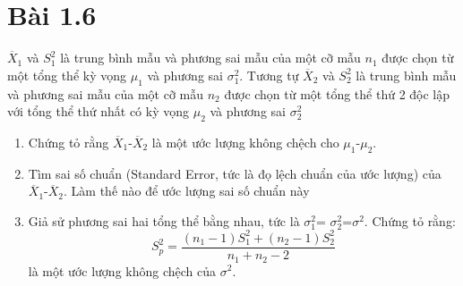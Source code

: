 \section*{Bài 1.6}
%

\begin{problem}{1.6}
$\overline{X}_1$ và $S^2_1$ là trung bình mẫu và phương sai mẫu của một cỡ mẫu $n_1$ được chọn từ một tổng thể kỳ vọng $\mu_1$ và phương sai $\sigma_1^2$. Tương tự $\overline{X}_2$ và $S^2_2$ là trung bình mẫu và phương sai mẫu của một cỡ mẫu $n_2$ được chọn từ một tổng thể thứ 2 độc lập với tổng thể thứ nhất có kỳ vọng $\mu_2$ và phương sai $\sigma_2^2$
\begin{enumerate}[label=(\alph*)]
\item Chứng tỏ rằng $\overline{X}_1$-$\overline{X}_2$ là một ước lượng không chệch cho $\mu_1$-$\mu_2$.
\item Tìm sai số chuẩn (Standard Error, tức là đọ lệch chuẩn của ước lượng) của $\overline{X}_1$-$\overline{X}_2$. Làm thế nào để ước lượng sai số chuẩn này
\item Giả sử phương sai hai tổng thể bằng nhau, tức là $\sigma_1^2$= $\sigma_2^2$=$\sigma^2$. Chứng tỏ rằng:
\[ S^2_p = \dfrac{(n_1-1)S^2_1+(n_2-1)S^2_2}{n_1+n_2-2}\]
là một ước lượng không chệch của  $\sigma^2$.
\end{enumerate}
\end{problem}

